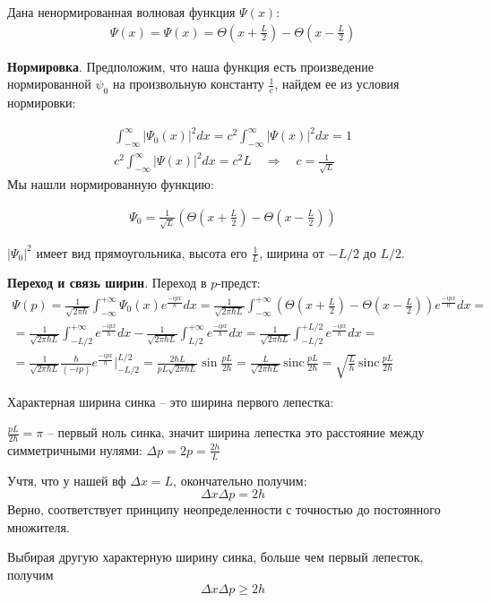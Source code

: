 Дана ненормированная волновая функция $\Psi(x)$:
\begin{gather*}
\Psi(x)=\Psi(x)=\Theta\left(x+\frac{L}{2}\right)-\Theta\left(x-\frac{L}{2}\right)
\end{gather*}

\textbf{Нормировка}. Предположим, что наша функция есть произведение нормированной $\psi_0$ на произвольную константу $\frac{1}{c}$, найдем ее из условия нормировки:

\begin{gather*}
\int_{-\infty}^{\infty}|\Psi_0(x)|^2 dx=
c^2\int_{-\infty}^{\infty}|\Psi(x)|^2 dx=1\\
c^2\int_{-\infty}^{\infty}|\Psi(x)|^2 dx=
c^2 L \quad\Rightarrow\quad c=\frac{1}{\sqrt{L}}
\end{gather*}
Мы нашли нормированную функцию:

\begin{gather*}
\Psi_0=\frac{1}{\sqrt{L}}\left(
	\Theta\left(x+\frac{L}{2}\right)-\Theta\left(x-\frac{L}{2}\right)
\right)
\end{gather*}

$|\Psi_0|^2$ имеет вид прямоугольника, высота его $\frac{1}{L}$, ширина от $-L/2$ до $L/2$.


\textbf{Переход и связь ширин}. Переход в $p$-предст:
\begin{gather*}
\Psi(p)=\frac{1}{\sqrt{2\pi\hbar}}\int_{-\infty}^{+\infty}\Psi_0(x)e^\frac{-ipx}{\hbar}dx=
\frac{1}{\sqrt{2\pi\hbar L}}\int_{-\infty}^{+\infty}\left(
	\Theta\left(x+\frac{L}{2}\right)-\Theta\left(x-\frac{L}{2}\right)
\right)e^\frac{-ipx}{\hbar}dx=\\=
\frac{1}{\sqrt{2\pi\hbar L}}\int_{-L/2}^{+\infty}e^\frac{-ipx}{\hbar}dx-\frac{1}{\sqrt{2\pi\hbar L}}\int_{L/2}^{+\infty}e^\frac{-ipx}{\hbar}dx=
\frac{1}{\sqrt{2\pi\hbar L}}\int_{-L/2}^{+L/2}e^\frac{-ipx}{\hbar}dx=\\=
\frac{1}{\sqrt{2\pi\hbar L}} \frac{\hbar}{(-ip)} e^\frac{-ipx}{\hbar}\bigg|_{-L/2}^{L/2}=\frac{2\hbar L}{pL\sqrt{2\pi\hbar L}}\sin\frac{pL}{2\hbar}
%
=\frac{L}{\sqrt{2\pi\hbar L}}\,\mathrm{sinc}\,\frac{pL}{2\hbar}
=\sqrt{\frac{L}{h}}\,\mathrm{sinc}\,\frac{pL}{2\hbar}
\end{gather*}

Характерная ширина синка -- это ширина первого лепестка:

$\frac{pL}{2\hbar}=\pi$ -- первый ноль синка, значит ширина лепестка это расстояние между симметричными нулями: $\Delta p = 2p=\frac{2h}{L}$

Учтя, что у нашей вф $\Delta x = L$, окончательно получим:
$$
\Delta x \Delta p = 2h
$$
Верно, соответствует принципу неопределенности с точностью до постоянного множителя.

Выбирая другую характерную ширину синка, больше чем первый лепесток, получим 
$$
\Delta x \Delta p \geq 2h
$$